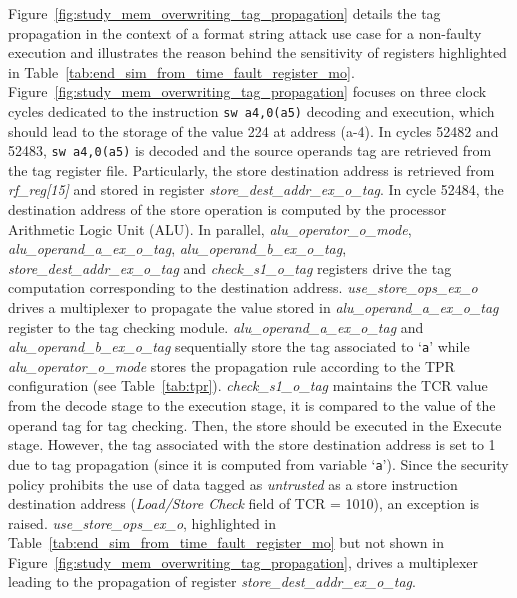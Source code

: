 Figure~\ref{fig:study_mem_overwriting_tag_propagation} details the tag propagation in the context of a format string attack use case for a non-faulty execution and illustrates the reason behind the sensitivity of registers highlighted in Table~\ref{tab:end_sim_from_time_fault_register_mo}.
Figure~\ref{fig:study_mem_overwriting_tag_propagation} focuses on three clock cycles dedicated to the instruction \verb|sw a4,0(a5)| decoding and execution, which should lead to the storage of the value 224 at address (a-4). 
In cycles 52482 and 52483, \verb|sw a4,0(a5)| is decoded and the source operands tag are retrieved from the tag register file. Particularly, the store destination address is retrieved from \textit{rf\_reg[15]} and stored in register \textit{store\_dest\_addr\_ex\_o\_tag}. In cycle 52484, the destination address of the store operation is computed by the processor Arithmetic Logic Unit (ALU).
In parallel, \textit{alu\_operator\_o\_mode}, \textit{alu\_operand\_a\_ex\_o\_tag}, \textit{alu\_operand\_b\_ex\_o\_tag}, \textit{store\_dest\_addr\_ex\_o\_tag} and \textit{check\_s1\_o\_tag} registers drive the tag computation corresponding to the destination address. 
\textit{use\_store\_ops\_ex\_o} drives a multiplexer to propagate the value stored in \textit{alu\_operand\_a\_ex\_o\_tag} register to the tag checking module. 
\textit{alu\_operand\_a\_ex\_o\_tag} and \textit{alu\_operand\_b\_ex\_o\_tag} sequentially store the tag associated to `\verb|a|' while \textit{alu\_operator\_o\_mode} stores the propagation rule according to the TPR configuration (see Table~\ref{tab:tpr}).
\textit{check\_s1\_o\_tag} maintains the TCR value from the decode stage to the execution stage, it is compared to the value of the operand tag for tag checking.
Then, the store should be executed in the Execute stage. However, the tag associated with the store destination address is set to 1 due to tag propagation (since it is computed from variable `\verb|a|'). 
Since the security policy prohibits the use of data tagged as \textit{untrusted} as a store instruction destination address (\textit{Load/Store Check} field of TCR = 1010), an exception is raised.
\textit{use\_store\_ops\_ex\_o}, highlighted in Table~\ref{tab:end_sim_from_time_fault_register_mo} but not shown in Figure~\ref{fig:study_mem_overwriting_tag_propagation}, drives a multiplexer leading to the propagation of register \textit{store\_dest\_addr\_ex\_o\_tag}.

